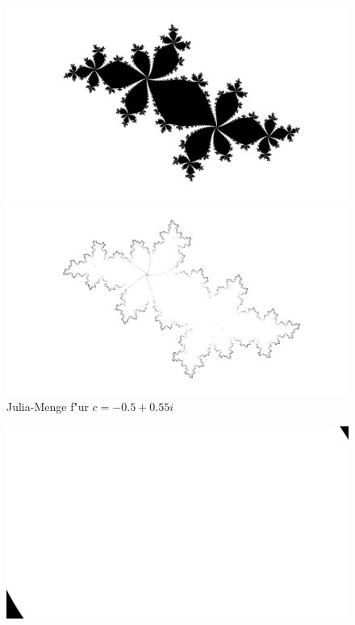 \begin{refsection}
\begin{figure}
\begin{center}
\includegraphics[width=\hsize]{julia/f.png}

\bigskip

\includegraphics[width=\hsize]{julia/j-f.png}
\end{center}
\caption{Julia-Menge f"ur $c= -0.5+0.55i$}
\end{figure}

\begin{figure}
\begin{center}
\includegraphics[width=\hsize]{julia/g.png}


\end{center}
\end{figure}
\end{refsection}
